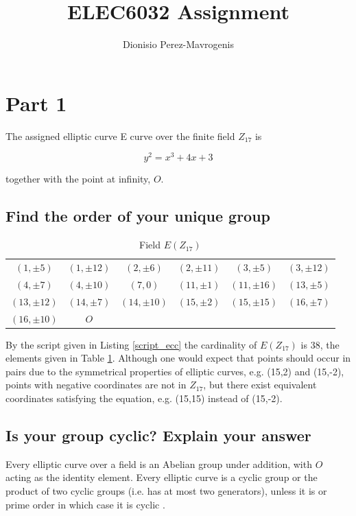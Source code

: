 \documentclass[12pt,a4paper,onecolumn]{article}
\author{Dionisio Perez-Mavrogenis}
\title{ELEC6032 Assignment}
\begin{document}
\maketitle

\section{Part 1}

The assigned elliptic curve E curve over the finite field $Z_{17}$ is 

$$ y^2 = x^3 + 4x + 3$$

together with the point at infinity, $O$.

\subsection{Find the order of your unique group}


\begin{table}[h]
\center
\caption{Field $E(Z_{17})$}
	\begin{tabular}{c c c c c c}
$(1,\pm5)$ & $(1,\pm12)$ & $(2,\pm6)$ & $(2,\pm11)$ & $(3,\pm5)$ & $(3,\pm12)$ \\
$(4,\pm7)$ & $(4,\pm10)$ & $(7,0)$    & $(11,\pm1)$ & $(11,\pm16)$ & $(13,\pm5)$ \\
$(13,\pm12)$ & $(14,\pm7)$ & $(14,\pm10)$ & $(15,\pm2)$ & $(15,\pm15)$ & $(16,\pm7)$ \\
$(16,\pm10)$ & $O$\\
	\end{tabular}
\label{table:points}
\end{table}

By the script given in Listing \ref{script_ecc} the cardinality of $E(Z_{17})$ is 38, the elements given in Table \ref{table:points}. Although one would expect that points should occur in pairs due to the symmetrical properties of elliptic curves, e.g. (15,2) and (15,-2), points with negative coordinates are not in $Z_{17}$, but there exist equivalent coordinates satisfying the equation, e.g. (15,15) instead of (15,-2).

\subsection{Is your group cyclic? Explain your answer}
Every elliptic curve over a field is an Abelian group under addition, with $O$ acting as the identity element. Every elliptic curve is a cyclic group or the product of two cyclic groups (i.e. has at most two generators), unless it is or prime order in which case it is cyclic \citep{website:cloudflare_primer} \citep{notes:ecc_notes}.
\end{document}
